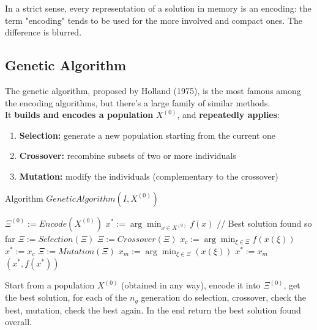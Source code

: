 In a strict sense, every representation of a solution in memory is an encoding: the term "encoding" tends to be used for the more involved and compact ones. The difference is blurred.\\

\newpage

\subsection{Genetic Algorithm}

The genetic algorithm, proposed by Holland (1975), is the most famous among the encoding algorithms, but there's a large family of similar methods.\\

It \textbf{builds and encodes a population} $X^{(0)}$, and \textbf{repeatedly applies}:
\begin{enumerate}
	\item \textbf{Selection:} generate a new population starting from the current one
	\item \textbf{Crossover:} recombine subsets of two or more individuals
	\item \textbf{Mutation:} modify the individuals (complementary to the crossover)
\end{enumerate}

\nn

\begin{algorithm}[H]
	\caption{Algorithm $GeneticAlgorithm(I , X^{(0)})$}
	\begin{algorithmic}
		\STATE $\Xi^{(0)} := Encode(X^{(0)})$
		\STATE $x^\ast := \arg \min_{x \in X^{(0)}} f(x)$ // Best solution found so far
		\STATE $\Xi := Selection(\Xi)$
		\STATE $\Xi := Crossover(\Xi)$
		\STATE $x_c := \arg \min_{\xi \in \Xi} f (x (\xi))$
		\STATE $x^\ast := x_c$
		\ENDIF
		\STATE $\Xi := Mutation(\Xi)$
		\STATE $x_m := \arg \min_{\xi \in \Xi} (x (\xi))$
		\STATE $x^\ast := x_m$
		\ENDIF
		\ENDFOR
		\RETURN $(x^\ast, f (x^\ast))$
	\end{algorithmic}
\end{algorithm}

Start from a population $X^{(0)}$ (obtained in any way), encode it into $\Xi^{(0)}$, get the best solution, for each of the $n_g$ generation do selection, crossover, check the best, mutation, check the best again. In the end return the best solution found overall.\\

